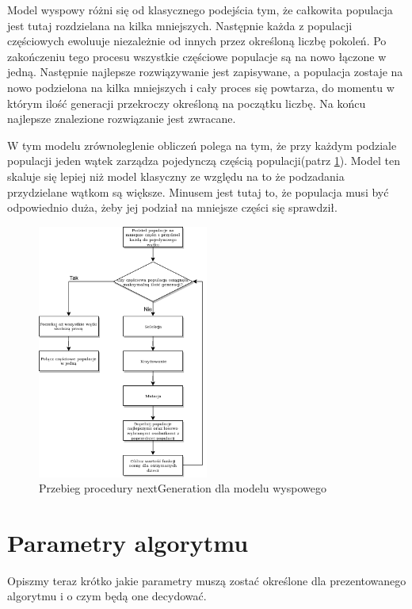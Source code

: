 Model wyspowy różni się od klasycznego podejścia tym, że całkowita populacja jest tutaj rozdzielana na kilka mniejszych. Następnie każda z 
populacji częściowych ewoluuje niezależnie od innych przez określoną liczbę pokoleń. Po zakończeniu tego procesu wszystkie częściowe populacje 
są na nowo łączone w jedną. Następnie najlepsze rozwiązywanie jest zapisywane, a populacja zostaje na nowo podzielona na kilka mniejszych i 
cały proces się powtarza, do momentu w którym ilość generacji przekroczy określoną na początku liczbę. Na końcu najlepsze znalezione rozwiązanie 
jest zwracane.

W tym modelu zrównoleglenie obliczeń polega na tym, że przy każdym podziale populacji jeden wątek zarządza pojedynczą częścią populacji(patrz \ref{next_gen_wyspowy_img}).
Model ten skaluje się lepiej niż model klasyczny ze względu na to że podzadania przydzielane wątkom są większe. Minusem jest tutaj to, że populacja 
musi być odpowiednio duża, żeby jej podział na mniejsze części się sprawdził.

\begin{figure}[H]
    \centering        
    \includegraphics[width=0.5\textwidth]{img/next_gen_wyspowy.png}
    \caption{Przebieg procedury nextGeneration dla modelu wyspowego}
    \label{next_gen_wyspowy_img}
\end{figure}


\section{Parametry algorytmu}
Opiszmy teraz krótko jakie parametry muszą zostać określone dla prezentowanego algorytmu i o czym będą one decydować.


